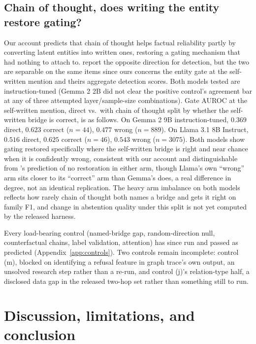 \documentclass{article}
\begin{document}
\subsection{Chain of thought, does writing the entity restore gating?}
\label{sec:res-cot}

Our account predicts that chain of thought helps factual reliability partly by converting latent
entities into written ones, restoring a gating mechanism that had nothing to attach to.
\citet{cheng2025cotobscures} report the opposite direction for detection, but the two are separable
on the same items since ours concerns the entity gate at the self-written mention and theirs
aggregate detection scores. Both models tested are instruction-tuned (Gemma 2 2B did not clear the
positive control's agreement bar at any of three attempted layer/sample-size combinations). Gate
AUROC at the self-written mention, direct vs.\ with chain of thought split by whether the
self-written bridge is correct, is as follows. On Gemma 2 9B instruction-tuned, $0.369$ direct,
$0.623$ correct ($n=44$), $0.477$ wrong ($n=889$). On Llama 3.1 8B Instruct, $0.516$ direct, $0.625$
correct ($n=46$), $0.543$ wrong ($n=3075$). Both models show gating restored specifically where the
self-written bridge is right and near chance when it is confidently wrong, consistent with our
account and distinguishable from \citet{cheng2025cotobscures}'s prediction of no restoration in
either arm, though Llama's own ``wrong'' arm sits closer to its ``correct'' arm than Gemma's does, a
real difference in degree, not an identical replication. The heavy arm imbalance on both models
reflects how rarely chain of thought both names a bridge and gets it right on family F1, and change
in abstention quality under this split is not yet computed by the released harness.

Every load-bearing control (named-bridge gap, random-direction null, counterfactual chains, label
validation, attention) has since run and passed as predicted (Appendix~\ref{app:controls}). Two
controls remain incomplete: control (m), blocked on identifying a refusal feature in graph trace's
own output, an unsolved research step rather than a re-run, and control (j)'s relation-type half, a
disclosed data gap in the released two-hop set rather than something still to run.

\section{Discussion, limitations, and conclusion}
\end{document}
